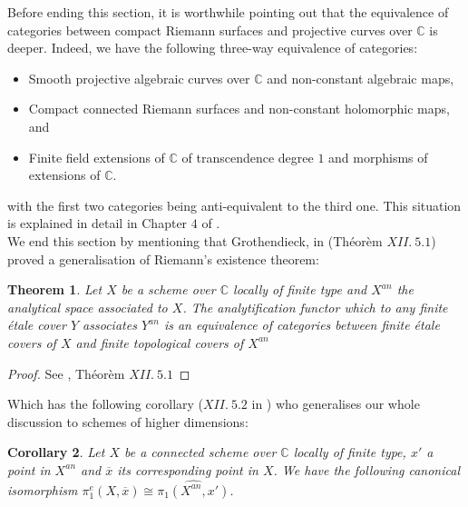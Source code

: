 \documentclass{article}
\theoremstyle{plain}
\newtheorem{theorem}{Theorem}[subsection]
\newtheorem{corollary}[theorem]{Corollary}
\theoremstyle{definition}
\begin{document}
\noindent Before ending this section, it is worthwhile pointing out that the equivalence of categories between compact Riemann surfaces and projective curves over $\mathbb{C}$ is deeper. 
Indeed, we have the following three-way equivalence of categories: 
\begin{itemize}
    \item[$a)$] Smooth projective algebraic curves over $\mathbb{C}$ and non-constant algebraic maps,
    \item[$b)$] Compact connected Riemann surfaces and non-constant holomorphic maps, and
    \item[$c)$] Finite field extensions of $\mathbb{C}$ of transcendence degree $1$ and morphisms of extensions of $\mathbb{C}$.
\end{itemize}
with the first two categories being anti-equivalent to the third one. This situation is explained in detail in Chapter $4$ of \cite{Szamuely}.\\
We end this section by mentioning that Grothendieck, in \cite{SGA} (Th\'eor\`em $XII.\:5.1$) proved a generalisation of Riemann's existence theorem:
\begin{theorem}
    Let $X$ be a scheme over $\mathbb{C}$ locally of finite type and $X^{an}$ the analytical space associated to $X$.
    The analytification functor which to any finite \'etale cover $Y$ associates $Y^{an}$ is an equivalence of categories between finite \'etale covers of $X$ and finite topological covers of $X^{an}$
\end{theorem}
\begin{proof}
    See \cite{SGA}, Th\'eor\`em $XII.\:5.1$
\end{proof}
\noindent Which has the following corollary ($XII.\:5.2$ in \cite{SGA}) who generalises our whole discussion to schemes of higher dimensions:
\begin{corollary}
    Let $X$ be a connected scheme over $\mathbb{C}$ locally of finite type, $x'$ a point in $X^{an}$ and $\overline{x}$ its corresponding point in $X$.
    We have the following canonical isomorphism $\pi^e_1(X,\overline{x}) \cong \widehat{\pi_1(X^{an},x')}$.
\end{corollary}
\end{document}
